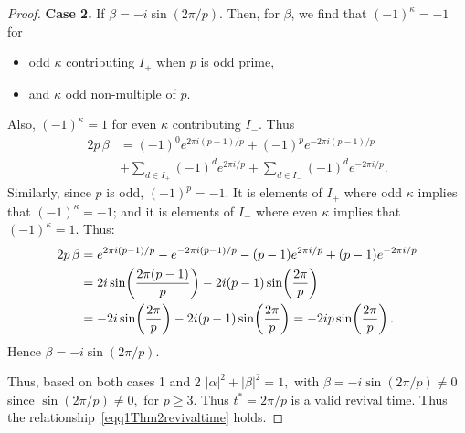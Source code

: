 \documentclass[10pt,a4paper]{amsart}
\begin{document}
\begin{proof}
  \medskip

\textbf{Case 2.} If $\beta= -i\sin(2\pi/p)$. Then, 
 for $\beta$, we find that $(-1)^{\kappa}=-1$ for
  \begin{itemize}
      \item  odd $\kappa$ contributing $I_+$ when $p$ is odd prime,
      \item and $\kappa$ odd non-multiple of $p$.
  \end{itemize}
Also, $(-1)^{\kappa}=1$ for even $\kappa$ contributing $I_-$. Thus
  \begin{align*}
    2p\,\beta &= (-1)^0 e^{2\pi i(p-1)/p} + (-1)^p e^{-2\pi i(p-1)/p}\\
&+ \sum_{d\in I_+}(-1)^d e^{2\pi i/p}  + \sum_{d\in I_-}(-1)^d e^{-2\pi i/p}.
  \end{align*}
Similarly, since $p$ is odd, $(-1)^p = -1$. It is elements of $I_+$ where odd $\kappa$ implies that $(-1)^{\kappa}=-1$; and it is elements
  of $I_-$ where even $\kappa$ implies that $(-1)^{\kappa}=1$. Thus:
  \begin{align*}
    2p\,\beta &= e^{2\pi i(p-1)/p} - e^{-2\pi i(p-1)/p}
                 - (p-1)e^{2\pi i/p} + (p-1)e^{-2\pi i/p}\notag\\
               &= 2i\sin\!\left(\frac{2\pi(p-1)}{p}\right) - 2i(p-1)\sin\!\left(\frac{2\pi}{p}\right)\notag\\
               &= -2i\sin\!\left(\frac{2\pi}{p}\right) - 2i(p-1)\sin\!\left(\frac{2\pi}{p}\right)
                = -2ip\sin\!\left(\frac{2\pi}{p}\right).\label{eq:beta_calc}
  \end{align*}
  Hence $\beta= -i\sin(2\pi/p)$.

Thus, based on both cases 1 and 2 $  |\alpha|^2 + |\beta|^2=1,$
  with $\beta = -i\sin(2\pi/p) \neq 0$ since $\sin(2\pi/p) \neq 0,$ for $p \geq 3$.  Thus $t^* = 2\pi/p$ is a valid revival time. Thus the relationship~\eqref{eqq1Thm2revivaltime} holds. 
\end{proof}
\end{document}

